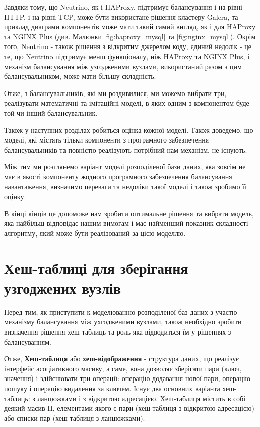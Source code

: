 \documentclass[14pt]{vakthesis}
\begin{document}
\begin{itemize}
Завдяки тому, що Neutrino, як і HAProxy, підтримує балансування і на рівні HTTP, і на рівні TCP, може бути використане рішення кластеру Galera, 
та приклад диаграми компонентів може мати такий самий вигляд, як і для HAProxy та NGINX Plus (див. Малюнки \ref{fig:haproxy_mysql} та \ref{fig:nginx_mysql}).
Окрім того, Neutrino - також рішення з відкритим джерелом коду, єдиний недолік - це те, що Neutrino підтримує менш функціоналу, ніж HAProxy та NGINX Plus, і механізм балансування між узгодженими вузлами, використаний разом з цим балансувальником, може мати більшу складність. 

\end{itemize}

Отже, з балансувальників, які ми роздивилися, ми можемо вибрати три, реалізувати математичні та імітаційні моделі, в яких одним з компонентом буде той чи інший балансувальник. 


Також у наступних розділах робиться оцінка кожної моделі. Також доведемо, що моделі, які містять тільки компоненти з програмного забезпечення балансувальників та повністю реалізують потрібний нам механізм, не існують.

Між тим ми розглянемо варіант моделі розподіленої бази даних, яка зовсім не має в якості компоненту жодного програмного забезпечення балансування навантаження, визначимо переваги та недоліки такої моделі і також зробимо її оцінку.

В кінці кінців це допоможе нам зробити оптимальне рішення та вибрати модель, яка найбільш відповідає нашим вимогам і має найменший показник складності алгоритму, який може бути реалізований за цією моделлю.

\section{Хеш-таблиці для зберігання узгоджених вузлів}

Перед тим, як приступити к моделюванню розподіленої баз даних з участю механізму балансування між ухгодженими вузлами, також необхідно зробити визначення рішення хеш-таблиць та роль яка відводиться їм у рішеннях з балансуванням. 

Отже, {\bfseries Хеш-таблиця } або {\bfseries хеш-відображення } - структура даних, що реалізує інтерфейс асоціативного масиву, а саме, вона дозволяє зберігати пари (ключ, значення) і здійснювати три операції: операцію додавання нової пари, операцію пошуку і операцію видалення за ключем. Існує два основних варіанта хеш-таблиць: з ланцюжками і з відкритою адресацією. Хеш-таблиця містить в собі деякий масив H, елементами якого є пари (хеш-таблиця з відкритою адресацією) або списки пар (хеш-таблиця з ланцюжками).
\end{document}
